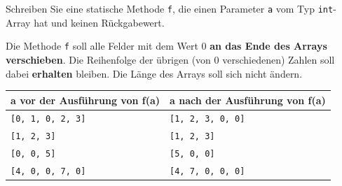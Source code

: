 \documentclass[
	fontsize=12pt,
	paper=a4,
	numbers=noenddot,
	parskip=half,
	openany
]{scrbook}
\begin{document}
Schreiben Sie eine statische Methode \texttt{f}, die einen Parameter \texttt{a} vom Typ \texttt{int}-Array hat und keinen Rückgabewert.

Die Methode \texttt{f} soll alle Felder mit dem Wert $0$ \textbf{an das Ende des Arrays verschieben}. Die Reihenfolge der übrigen (von $0$ verschiedenen) Zahlen soll dabei \textbf{erhalten} bleiben. Die Länge des Arrays soll sich nicht ändern.

\begin{center}
\begin{tabular}{l l}
	\toprule
	\textbf{a vor der Ausführung von f(a)} & \textbf{a nach der Ausführung von f(a)} \\
	\midrule
	\texttt{[0, 1, 0, 2, 3]} & \texttt{[1, 2, 3, 0, 0]} \\
	\texttt{[1, 2, 3]}       & \texttt{[1, 2, 3]} \\
	\texttt{[0, 0, 5]}       & \texttt{[5, 0, 0]} \\
	\texttt{[4, 0, 0, 7, 0]} & \texttt{[4, 7, 0, 0, 0]} \\
	\bottomrule
\end{tabular}
\end{center}
\end{document}

